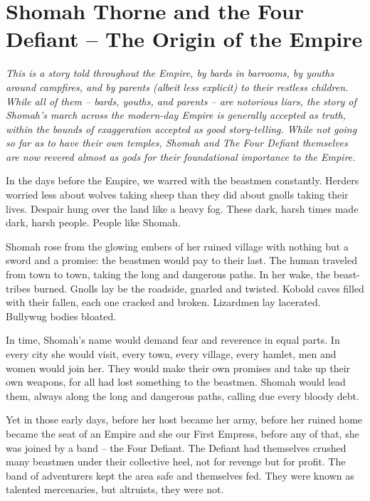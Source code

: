 \section{Shomah Thorne and the Four Defiant -- The Origin of the Empire}

\textit{This is a story told throughout the Empire, by bards in barrooms, by youths around
  campfires, and by parents (albeit less explicit) to their restless children.
While all of them -- bards, youths, and parents -- are notorious liars, the story of Shomah's
  march across the modern-day Empire is generally accepted as truth, within the bounds of
  exaggeration accepted as good story-telling.
While not going so far as to have their own temples, Shomah and The Four Defiant themselves are now
  revered almost as gods for their foundational importance to the Empire.}

\medskip

In the days before the Empire, we warred with the beastmen constantly.
Herders worried less about wolves taking sheep than they did about gnolls taking their lives.
Despair hung over the land like a heavy fog.
These dark, harsh times made dark, harsh people.
People like Shomah.

Shomah rose from the glowing embers of her ruined village with nothing but a sword and a promise:
  the beastmen would pay to their last.
The human traveled from town to town, taking the long and dangerous paths.
In her wake, the beast-tribes burned.
Gnolls lay be the roadside, gnarled and twisted.
Kobold caves filled with their fallen, each one cracked and broken.
Lizardmen lay lacerated.
Bullywug bodies bloated.

In time, Shomah's name would demand fear and reverence in equal parts.
In every city she would visit, every town, every village, every hamlet,
  men and women would join her.
They would make their own promises and take up their own weapons, for all had lost something
  to the beastmen.
Shomah would lead them, always along the long and dangerous paths, calling due every bloody debt.

Yet in those early days, before her host became her army, before her ruined home became the seat of
  an Empire and she our First Empress, before any of that, she was joined by a band
  -- the Four Defiant.
The Defiant had themselves crushed many beastmen under their collective heel,
  not for revenge but for profit.
The band of adventurers kept the area safe and themselves fed.
They were known as talented mercenaries, but altruists, they were not.

